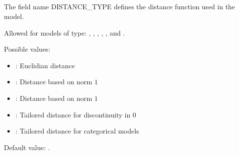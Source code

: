 \documentclass[letterpaper,10pt,english]{sphinxmanual}
\begin{document}
\subsection{}
\label{\detokenize{SgteLib:distance-type}}\label{\detokenize{SgteLib:id17}}
\begin{DUlineblock}{0em}
\item[] The field name DISTANCE\_TYPE defines the distance function used in the model.
\item[] Allowed for models of type: {\hyperref[\detokenize{SgteLib:rbf}]{}}, {\hyperref[\detokenize{SgteLib:ks}]{}}, {\hyperref[\detokenize{SgteLib:kriging}]{}}, {\hyperref[\detokenize{SgteLib:lowess}]{}}, {\hyperref[\detokenize{SgteLib:cn}]{}}, {\hyperref[\detokenize{SgteLib:ensemble}]{}} and {\hyperref[\detokenize{SgteLib:ensemble-stat}]{}}.
\item[] Possible values:
\end{DUlineblock}
\begin{itemize}
\item {} 
\sphinxAtStartPar
{}: Euclidian distance

\item {} 
\sphinxAtStartPar
{}: Distance based on norm \(1\)

\item {} 
\sphinxAtStartPar
{}: Distance based on norm \(1\)

\item {} 
\sphinxAtStartPar
{}: Tailored distance for discontinuity in \(0\)

\item {} 
\sphinxAtStartPar
{}: Tailored distance for categorical models

\end{itemize}

\begin{DUlineblock}{0em}
\item[] Default value: .
\end{DUlineblock}
\end{document}
